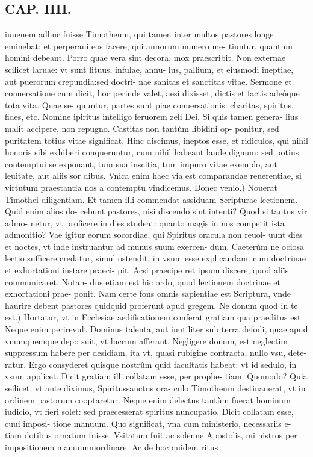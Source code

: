 \documentclass{article}
\begin{document}
\begin{pages}
\section*{CAP. IIII. }
\marginpar{[ p.52 ]}\pstart iuuenem adhuc fuisse Timotheum, qui tamen inter multos pastores longe eminebat: et perperaui eos facere, qui annorum numero me- tiuntur, quantum homini debeant. Porro quae vera sint decora, mox praescribit. Non externae scilicet laruae: vt sunt lituus, infulae, annu- lus, pallium, et eiusmodi ineptiae, aut puerorum crepundia:sed doctri- nae sanitas et sanctitas vitae. Sermone et conuersatione cum dicit, hoc perinde valet, aesi dixisset, dictis et factis adeôque tota vita. Quae se- quuntur, partes sunt piae conuersationis: charitas, spiritus, fides, etc. Nomine ipiritus intelligo feruorem zeli Dei. Si quis tamen genera- lius malit accipere, non repugno. Castitas non tantùm libidini op- ponitur, sed puritatem totius vitae significat. Hinc discimus, ineptos esse, et ridiculos, qui nihil honoris sibi exhiberi conqueruntur, cum nihil habeant laude dignum: sed potius contemptui se exponant, tum sua inscitia, tum impuro vitae exemplo, aut leuitate, aut aliis sor dibus. Vnica enim haec via est comparandae reuerentiae, si virtutum praestantia nos a contemptu vindicemus.  \pend\pstart Donec venio.) Nouerat Timothei diligentiam. Et tamen illi commendat assiduam Scripturae lectionem. Quid enim alios do- cebunt pastores, nisi discendo sint intenti? Quod si tantus vir admo- netur, vt proficere in dies studeat: quanto magis in nos competit ista admonitio? Vae igitur eorum socordiae, qui Spiritus oracula non reuol- uunt dies et noctes, vt inde instruantur ad munus suum exercen- dum. Caeterùm ne ociosa lectio sufficere credatur, simul ostendit, in vsum esse explicandam: cum doctrinae et exhortationi instare praeci- pit. Acsi praecipe ret ipsum discere, quod aliïs communicaret. Notan- dus etiam est hic ordo, quod lectionem doctrinae et exhortationi prae- ponit. Nam certe fons omnis sapientiae est Scriptura, vnde haurire debent pastores quidquid proferunt apud gregem.  \pend\pstart Ne donum quod in te est.) Hortatur, vt in Ecclesiae aedificationem conferat gratiam qua praeditus est. Neque enim perirevult Dominus talenta, aut inutiliter sub terra defodi, quae apud vnumquemque depo suit, vt lucrum afferant. Negligere donum, est neglectim suppressum habere per desidiam, ita vt, quasi rubigine contracta, nullo vsu, dete- ratur. Ergo consyderet quisque nostrûm quid facultatis habeat: vt id sedulo, in vsum applicet. Dicit gratiam illi collatam esse, per prophe- tiam. Quomodo? Quia seilicet, vt ante diximus, Spiritussanctus ora- culo Timotheum destinauerat, vt in ordinem pastorum cooptaretur. Neque enim delectus tantùm fuerat hominum iudicio, vt fieri solet: sed praecesserat spiritus nuncupatio. Dicit collatam esse, cuui imposi- tione manuum. Quo significat, vna cum ministerio, necessariis e- tiam dotibus ornatum fuisse. Vsitatum fuit ac solenne Apostolis, mi nistros per impositionem manuummordinare. Ac de hoc quidem ritus  \pend

\end{pages}
\end{document}
